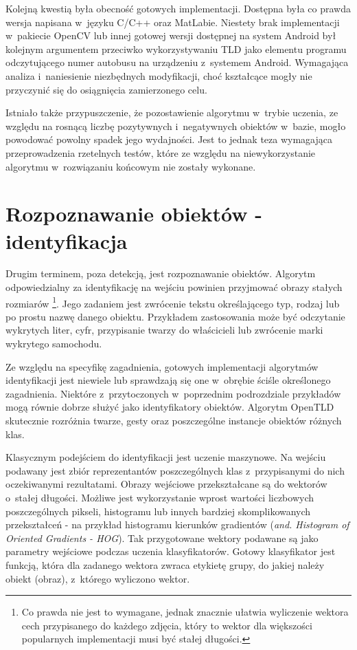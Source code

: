 Kolejną kwestią była obecność gotowych implementacji.
Dostępna była co prawda wersja napisana w~języku C/C++ oraz MatLabie.
Niestety brak implementacji w~pakiecie OpenCV lub
innej gotowej wersji dostępnej na system Android był kolejnym
argumentem przeciwko wykorzystywaniu TLD jako elementu
programu odczytującego numer autobusu na urządzeniu z~systemem Android.
Wymagająca analiza i~naniesienie
niezbędnych modyfikacji,
choć kształcące mogły nie przyczynić się do osiągnięcia zamierzonego celu.

Istniało także przypuszczenie, że pozostawienie algorytmu w~trybie uczenia,
ze względu na rosnącą liczbę pozytywnych i~negatywnych obiektów w~bazie,
mogło powodować powolny spadek jego wydajności. Jest to jednak teza 
wymagająca przeprowadzenia rzetelnych testów, które ze względu
na niewykorzystanie algorytmu w~rozwiązaniu końcowym nie zostały
wykonane.

\section{Rozpoznawanie obiektów - identyfikacja}

Drugim terminem, poza detekcją, jest rozpoznawanie obiektów. Algorytm
odpowiedzialny za 
identyfikację na wejściu powinien przyjmować obrazy stałych rozmiarów
\footnote{Co prawda nie jest to wymagane, jednak znacznie ułatwia 
wyliczenie wektora cech przypisanego do każdego zdjęcia, który to 
wektor dla większości popularnych implementacji musi być stałej 
długości.}.
Jego zadaniem jest zwrócenie
tekstu określającego typ, rodzaj lub po prostu nazwę danego obiektu.
Przykładem zastosowania może być odczytanie wykrytych liter,
cyfr, przypisanie twarzy do właścicieli lub zwrócenie marki wykrytego
samochodu.

Ze względu na specyfikę zagadnienia, gotowych implementacji algorytmów
identyfikacji jest niewiele lub sprawdzają się one w~obrębie
ściśle określonego zagadnienia. Niektóre z~przytoczonych w~poprzednim
podrozdziale przykładów mogą równie dobrze służyć jako identyfikatory
obiektów. Algorytm OpenTLD skutecznie rozróżnia twarze, gesty oraz
poszczególne instancje obiektów różnych klas.

Klasycznym podejściem do identyfikacji jest uczenie maszynowe. Na
wejściu podawany jest zbiór reprezentantów poszczególnych klas
z~przypisanymi do nich oczekiwanymi rezultatami. 
Obrazy wejściowe przekształcane są do wektorów o~stałej długości. 
Możliwe jest wykorzystanie wprost wartości liczbowych poszczególnych 
pikseli, histogramu lub innych bardziej skomplikowanych 
przekształceń - na przykład histogramu kierunków gradientów (\textit{and. Histogram
	of Oriented Gradients - HOG}). Tak przygotowane wektory podawane
są jako parametry wejściowe podczas uczenia klasyfikatorów.
Gotowy klasyfikator jest funkcją, która dla zadanego wektora
zwraca etykietę grupy, do jakiej należy obiekt (obraz), z~którego wyliczono wektor.

